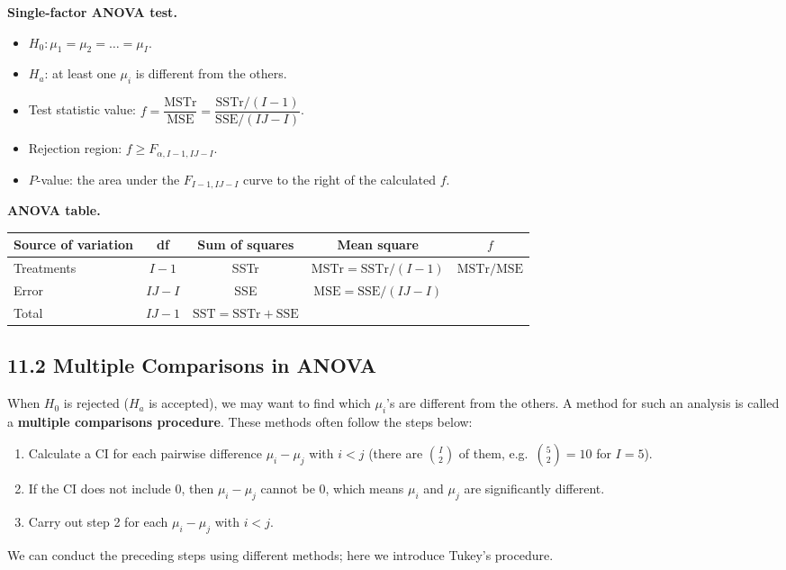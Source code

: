 \textbf{Single-factor ANOVA test.}
\begin{itemize}
  \item $H_0:\mu_1=\mu_2=\dots=\mu_I$.
  \item $H_a$: at least one $\mu_i$ is different from the others.
  \item Test statistic value: $f=\dfrac{\mathrm{MSTr}}{\mathrm{MSE}}=\dfrac{\mathrm{SSTr}/(I-1)}{\mathrm{SSE}/(IJ-I)}$.
  \item Rejection region: $f\ge F_{\alpha,I-1,IJ-I}$.
  \item $P$-value: the area under the $F_{I-1,IJ-I}$ curve to the right of the calculated $f$.
\end{itemize}

\textbf{ANOVA table.}
\begin{center}
\begin{tabular}{lcccc}
\toprule
Source of variation & df & Sum of squares & Mean square & $f$\\
\midrule
Treatments & $I-1$  & SSTr & $\mathrm{MSTr}=\mathrm{SSTr}/(I-1)$ & $\mathrm{MSTr}/\mathrm{MSE}$\\
Error      & $IJ-I$ & SSE  & $\mathrm{MSE}=\mathrm{SSE}/(IJ-I)$ & \\
Total      & $IJ-1$ & $\mathrm{SST}=\mathrm{SSTr}+\mathrm{SSE}$ & & \\
\bottomrule
\end{tabular}
\end{center}

\subsection*{11.2 Multiple Comparisons in ANOVA}

When $H_0$ is rejected ($H_a$ is accepted), we may want to find which $\mu_i$'s are different from the others.
A method for such an analysis is called a \textbf{multiple comparisons procedure}. These methods often follow the steps below:
\begin{enumerate}
  \item Calculate a CI for each pairwise difference $\mu_i-\mu_j$ with $i<j$ (there are $\binom{I}{2}$ of them, e.g.\ $\binom{5}{2}=10$ for $I=5$).
  \item If the CI does not include 0, then $\mu_i-\mu_j$ cannot be 0, which means $\mu_i$ and $\mu_j$ are significantly different.
  \item Carry out step 2 for each $\mu_i-\mu_j$ with $i<j$.
\end{enumerate}
We can conduct the preceding steps using different methods; here we introduce Tukey's procedure.

